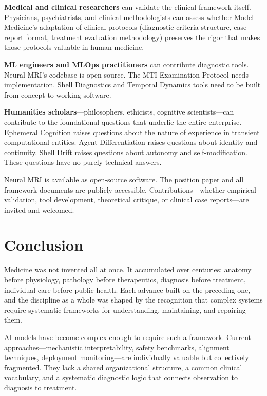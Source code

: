 \documentclass[11pt]{article}
\begin{document}
\textbf{Medical and clinical researchers} can validate the clinical framework itself. Physicians, psychiatrists, and clinical methodologists can assess whether Model Medicine's adaptation of clinical protocols (diagnostic criteria structure, case report format, treatment evaluation methodology) preserves the rigor that makes those protocols valuable in human medicine.

\textbf{ML engineers and MLOps practitioners} can contribute diagnostic tools. Neural MRI's codebase is open source. The MTI Examination Protocol needs implementation. Shell Diagnostics and Temporal Dynamics tools need to be built from concept to working software.

\textbf{Humanities scholars}---philosophers, ethicists, cognitive scientists---can contribute to the foundational questions that underlie the entire enterprise. Ephemeral Cognition raises questions about the nature of experience in transient computational entities. Agent Differentiation raises questions about identity and continuity. Shell Drift raises questions about autonomy and self-modification. These questions have no purely technical answers.

Neural MRI is available as open-source software. The position paper and all framework documents are publicly accessible. Contributions---whether empirical validation, tool development, theoretical critique, or clinical case reports---are invited and welcomed.


\section{Conclusion}

Medicine was not invented all at once. It accumulated over centuries: anatomy before physiology, pathology before therapeutics, diagnosis before treatment, individual care before public health. Each advance built on the preceding one, and the discipline as a whole was shaped by the recognition that complex systems require systematic frameworks for understanding, maintaining, and repairing them.

AI models have become complex enough to require such a framework. Current approaches---mechanistic interpretability, safety benchmarks, alignment techniques, deployment monitoring---are individually valuable but collectively fragmented. They lack a shared organizational structure, a common clinical vocabulary, and a systematic diagnostic logic that connects observation to diagnosis to treatment.
\end{document}
